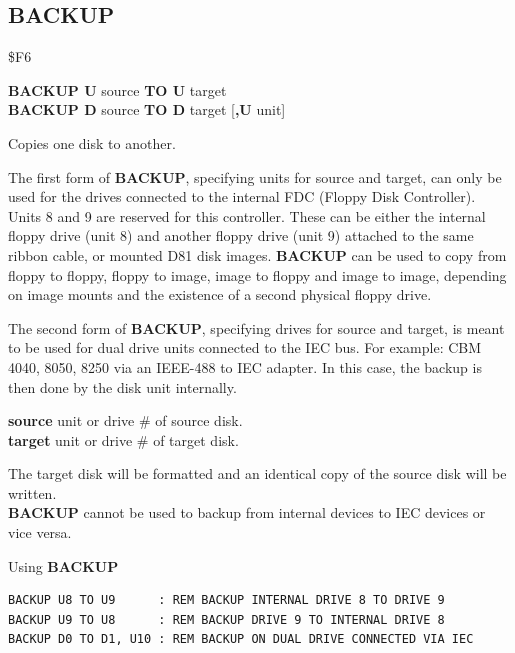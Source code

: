 
\newpage
\subsection{BACKUP}
\begin{description}[leftmargin=2cm,style=nextline]
\item [Token:] \$F6
\item [Format:] {\bf BACKUP U} source {\bf TO U} target \\
                {\bf BACKUP D} source {\bf TO D} target [{\bf,U} unit]
\item [Usage:] Copies one disk to another.

               The first form of {\bf BACKUP}, specifying
               units for source and target, can only be used for the drives
               connected to the internal FDC (Floppy Disk Controller).
               Units 8 and 9 are reserved for this controller.
               These can be either the internal floppy drive (unit 8) and
               another floppy drive (unit 9) attached to the same ribbon cable,
               or mounted D81 disk images. {\bf BACKUP} can be used to
               copy from floppy to floppy, floppy to image, image to floppy
               and image to image, depending on image mounts and the existence of
               a second physical floppy drive.

               The second form of {\bf BACKUP}, specifying
               drives for source and target, is meant to be used for
               dual drive units connected to the IEC bus.
   For example: CBM 4040, 8050, 8250 via an IEEE-488 to IEC adapter.
   In this case, the backup is then done by the disk unit internally.

   {\bf source} unit or drive \# of source disk. \\
   {\bf target} unit or drive \# of target disk.

\item [Remarks:] The target disk will be formatted and
                 an identical copy of the source disk will be written. \\
                 {\bf BACKUP} cannot be used to backup
                 from internal devices to IEC devices or vice versa.

\item [Examples:] Using {\bf BACKUP}

\begin{tcolorbox}[colback=black,coltext=white]
\verbatimfont{\codefont}
\begin{verbatim}
BACKUP U8 TO U9      : REM BACKUP INTERNAL DRIVE 8 TO DRIVE 9
BACKUP U9 TO U8      : REM BACKUP DRIVE 9 TO INTERNAL DRIVE 8
BACKUP D0 TO D1, U10 : REM BACKUP ON DUAL DRIVE CONNECTED VIA IEC
\end{verbatim}
\end{tcolorbox}
\end{description}

